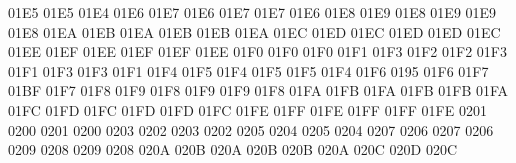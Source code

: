 \setcclcuc 01E5 01E5 01E4 %
\setcclcuc 01E6 01E7 01E6 %
\setcclcuc 01E7 01E7 01E6 %
\setcclcuc 01E8 01E9 01E8 %
\setcclcuc 01E9 01E9 01E8 %
\setcclcuc 01EA 01EB 01EA %
\setcclcuc 01EB 01EB 01EA %
\setcclcuc 01EC 01ED 01EC %
\setcclcuc 01ED 01ED 01EC %
\setcclcuc 01EE 01EF 01EE %
\setcclcuc 01EF 01EF 01EE %
\setcclcuc 01F0 01F0 01F0 %
\setcclcuc 01F1 01F3 01F2 %
\setcclcuc 01F2 01F3 01F1 %
\setcclcuc 01F3 01F3 01F1 %
\setcclcuc 01F4 01F5 01F4 %
\setcclcuc 01F5 01F5 01F4 %
\setcclcuc 01F6 0195 01F6 %
\setcclcuc 01F7 01BF 01F7 %
\setcclcuc 01F8 01F9 01F8 %
\setcclcuc 01F9 01F9 01F8 %
\setcclcuc 01FA 01FB 01FA %
\setcclcuc 01FB 01FB 01FA %
\setcclcuc 01FC 01FD 01FC %
\setcclcuc 01FD 01FD 01FC %
\setcclcuc 01FE 01FF 01FE %
\setcclcuc 01FF 01FF 01FE %
 0201 0200 %
 0201 0200 %
 0203 0202 %
 0203 0202 %
 0205 0204 %
 0205 0204 %
 0207 0206 %
 0207 0206 %
 0209 0208 %
 0209 0208 %
\setcclcuc 020A 020B 020A %
\setcclcuc 020B 020B 020A %
\setcclcuc 020C 020D 020C %
